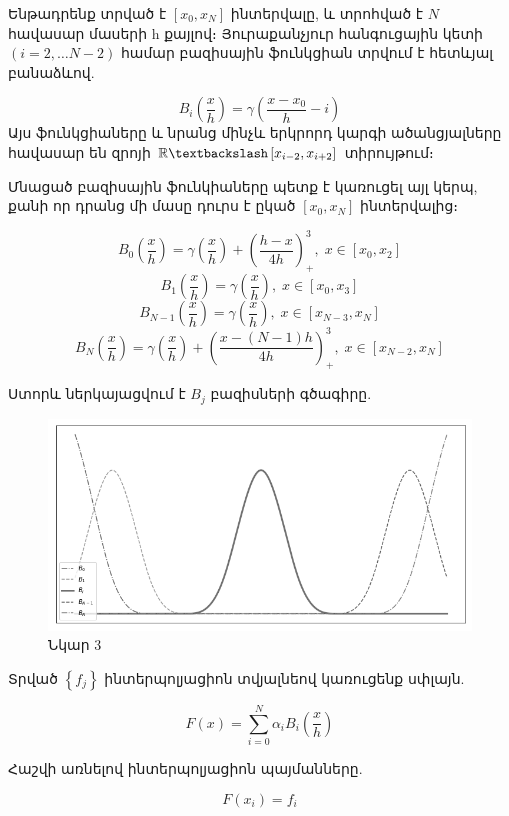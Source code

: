 \documentclass[fleqn, bachelor,subf,12pt,notitlepage]{disser}
\begin{document}
Ենթադրենք տրված է $\left[x_{0}, x_{N}\right]$ ինտերվալը, և տրոհված է $N$ հավասար մասերի h քայլով։ Յուրաքանչյուր հանգուցային կետի $(i=2, \dots N-2)$ համար բազիսային ֆունկցիան տրվում է հետևյալ բանաձևով.

					$$B_{i}\left(\dfrac{x}{h}\right)=\gamma \left(\frac{x-x_{0}}{h}-i\right)$$
Այս ֆունկցիաները և նրանց մինչև երկրորդ կարգի ածանցյալները հավասար են զրոյի $\mathbb{R} \textbackslash \left[x_{i-2}, x_{i+2}\right]$ տիրույթում։

Մնացած բազիսային ֆունկիաները պետք է կառուցել այլ կերպ, քանի որ դրանց մի մասը դուրս է ըկած  $\left[x_{0}, x_{N}\right]$ ինտերվալից։

$$B_{0}\left(\frac{x}{h}\right) = \gamma \left(\frac{x}{h}\right) + \left(\dfrac{h - x}{4h}\right)^{3}_{+} , \; x \in \left[x_{0}, x_{2}\right]$$
$$B_{1}\left(\frac{x}{h}\right) = \gamma \left(\frac{x}{h}\right), \; x \in \left[x_{0}, x_{3}\right]$$
$$B_{N-1}\left(\frac{x}{h}\right) = \gamma \left(\frac{x}{h}\right), \; x \in \left[x_{N-3}, x_{N}\right]$$
$$B_{N}\left(\frac{x}{h}\right) = \gamma \left(\frac{x}{h}\right) + \left(\dfrac{x - (N-1)h}{4h}\right)^{3}_{+} , \; x \in \left[x_{N-2}, x_{N}\right]$$

Ստորև ներկայացվում է $B_{j}$ բազիսների գծագիրը.

\begin{figure}[h!]
\centering
\includegraphics[width=1.0\textwidth]{images/all_cubic_compact_support_basis}
\captionsetup{labelformat=empty}
\caption{\hfill Նկար 3}
\end{figure}

Տրված $\left\{f_{j}\right\}$ ինտերպոլյացիոն տվյալնեով կառուցենք սփլայն.

				$$ F(x) = \sum_{i=0}^{N} \alpha_{i}B_{i}\left(\frac{x}{h}\right)$$

Հաշվի առնելով ինտերպոլյացիոն պայմանները.

				$$F(x_{i}) = f_{i}$$
\end{document}
